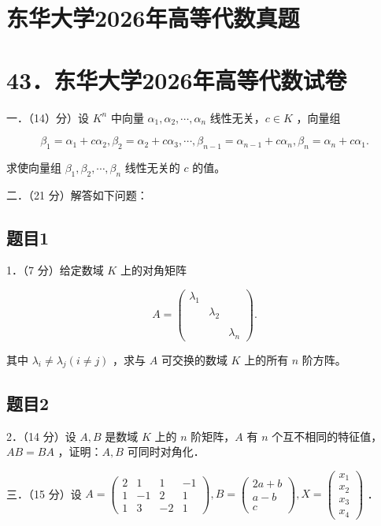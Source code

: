 \documentclass{article}
\begin{document}
\section*{东华大学2026年高等代数真题}
\section*{43．东华大学2026年高等代数试卷}
一．（14）分）设 \(K^{n}\) 中向量 \(\alpha_{1}, \alpha_{2}, \cdots, \alpha_{n}\) 线性无关，\(c \in K\) ，向量组

\[
\beta_{1}=\alpha_{1}+c \alpha_{2}, \beta_{2}=\alpha_{2}+c \alpha_{3}, \cdots, \beta_{n-1}=\alpha_{n-1}+c \alpha_{n}, \beta_{n}=\alpha_{n}+c \alpha_{1} .
\]

求使向量组 \(\beta_{1}, \beta_{2}, \cdots, \beta_{n}\) 线性无关的 \(c\) 的值。

二．（21 分）解答如下问题：\\

\subsection{题目1}
1．（7 分）给定数域 \(K\) 上的对角矩阵

\[
A=\left(\begin{array}{lll}
\lambda_{1} & & \\
& \lambda_{2} & \\
& & \\
& & \lambda_{n}
\end{array}\right) .
\]

其中 \(\lambda_{i} \neq \lambda_{j}(i \neq j)\) ，求与 \(A\) 可交换的数域 \(K\) 上的所有 \(n\) 阶方阵。\\

\subsection{题目2}
2．（14 分）设 \(A, B\) 是数域 \(K\) 上的 \(n\) 阶矩阵，\(A\) 有 \(n\) 个互不相同的特征值，\(A B=B A\) ，证明：\(A, B\) 可同时对角化．

三．（15 分）设 \(A=\left(\begin{array}{cccc}2 & 1 & 1 & -1 \\ 1 & -1 & 2 & 1 \\ 1 & 3 & -2 & 1\end{array}\right), B=\left(\begin{array}{c}2 a+b \\ a-b \\ c\end{array}\right), X=\left(\begin{array}{l}x_{1} \\ x_{2} \\ x_{3} \\ x_{4}\end{array}\right)\) ．\\
\end{document}
